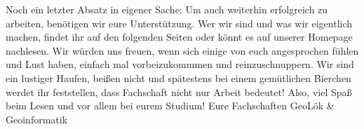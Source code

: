 Noch ein letzter Absatz in eigener Sache: Um auch weiterhin erfolgreich zu arbeiten, benötigen wir eure Unterstützung. Wer wir sind und was wir eigentlich machen, findet ihr auf den folgenden Seiten oder könnt es auf unserer Homepage nachlesen. Wir würden uns freuen, wenn sich einige von euch angesprochen fühlen und Lust haben, einfach mal vorbeizukommmen und reinzuschnuppern. Wir sind ein lustiger Haufen, beißen nicht und spätestens bei einem gemütlichen Bierchen werdet ihr feststellen, dass Fachschaft nicht nur Arbeit bedeutet! Also, viel Spaß beim Lesen und vor allem bei eurem Studium!
\bigskip
\newline
Eure Fachschaften GeoLök \& Geoinformatik


